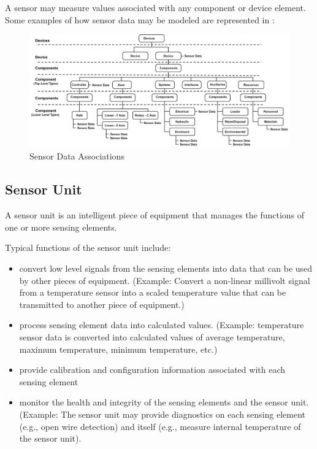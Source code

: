 \documentclass{mtconnect}	%
\begin{document}
A sensor may measure values associated with any \gls{component} or \gls{device} element.   Some examples of how sensor data may be modeled are represented in :

\begin{figure}[ht]
  \centering
  \includegraphics[width=.75\textwidth]{figures/sensor-data-associations.png}
  \caption{Sensor Data Associations}
  \label{fig:sensor-data-associations}
\end{figure}

\subsection{Sensor Unit}
\label{sec:Sensor Unit}

A \gls{sensor unit} is an intelligent piece of equipment that manages the functions of one or more \glspl{sensing element}.

Typical functions of the \gls{sensor unit} include:

\begin{itemize}
\item convert low level signals from the \glspl{sensing element} into data that can be used by other pieces of equipment.  (Example:  Convert a non-linear millivolt signal from a temperature sensor into a scaled temperature value that can be transmitted to another piece of equipment.)

\item process \gls{sensing element} data into calculated values.  (Example:  temperature sensor data is converted into calculated values of average temperature, maximum temperature, minimum temperature, etc.)

\item provide calibration and configuration information associated with each \gls{sensing element}

\item monitor the health and integrity of the \glspl{sensing element} and the \gls{sensor unit}.  (Example:  The \gls{sensor unit} may provide diagnostics on each \gls{sensing element} (e.g., open wire detection) and itself (e.g., measure internal temperature of the \gls{sensor unit}).
\end{itemize}
\end{document}
